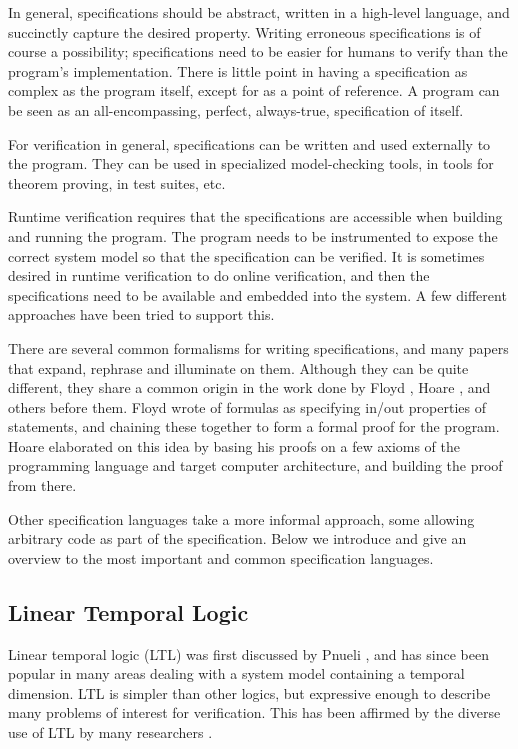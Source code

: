 \documentclass[a4paper,11pt]{kth-mag}
\theoremstyle{definition}
\begin{document}
In general, specifications should be abstract, written in a high-level
language, and succinctly capture the desired property. Writing erroneous
specifications is of course a possibility; specifications need to be easier for
humans to verify than the program's implementation. There is little point in
having a specification as complex as the program itself, except for as a point
of reference. A program can be seen as an all-encompassing, perfect,
always-true, specification of itself.

For verification in general, specifications can be written and used externally
to the program. They can be used in specialized model-checking tools, in tools
for theorem proving, in test suites, etc.

Runtime verification requires that the specifications are accessible when
building and running the program. The program needs to be instrumented to
expose the correct system model so that the specification can be verified. It
is sometimes desired in runtime verification to do online verification, and
then the specifications need to be available and embedded into the system. A
few different approaches have been tried to support this.

There are several common formalisms for writing specifications, and many papers
that expand, rephrase and illuminate on them. Although they can be quite
different, they share a common origin in the work done by Floyd \cite{floyd67},
Hoare \cite{hoare69}, and others before them. Floyd wrote of formulas as
specifying in/out properties of statements, and chaining these together to form
a formal proof for the program. Hoare elaborated on this idea by basing his
proofs on a few axioms of the programming language and target computer
architecture, and building the proof from there.

Other specification languages take a more informal approach, some allowing
arbitrary code as part of the specification. Below we introduce and give an
overview to the most important and common specification languages.


\subsection{Linear Temporal Logic} \label{section-ltl}

Linear temporal logic (LTL) was first discussed by Pnueli \cite{pnueli77}, and
has since been popular in many areas dealing with a system model containing a
temporal dimension. LTL is simpler than other logics, but expressive enough to
describe many problems of interest for verification. This has been affirmed by
the diverse use of LTL by many researchers \cite{pnueli77}.
\end{document}
